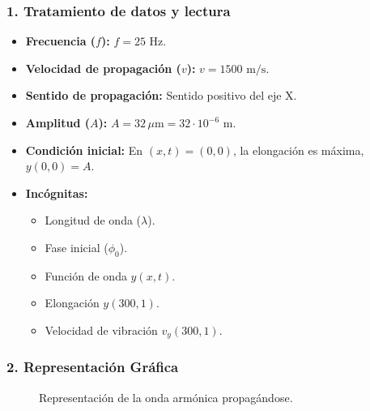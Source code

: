 \subsubsection*{1. Tratamiento de datos y lectura}
\begin{itemize}
    \item \textbf{Frecuencia ($f$):} $f = 25 \text{ Hz}$.
    \item \textbf{Velocidad de propagación ($v$):} $v = 1500 \text{ m/s}$.
    \item \textbf{Sentido de propagación:} Sentido positivo del eje X.
    \item \textbf{Amplitud ($A$):} $A = 32 \, \mu\text{m} = 32 \cdot 10^{-6} \text{ m}$.
    \item \textbf{Condición inicial:} En $(x,t)=(0,0)$, la elongación es máxima, $y(0,0)=A$.
    \item \textbf{Incógnitas:}
    \begin{itemize}
        \item Longitud de onda ($\lambda$).
        \item Fase inicial ($\phi_0$).
        \item Función de onda $y(x,t)$.
        \item Elongación $y(300, 1)$.
        \item Velocidad de vibración $v_y(300, 1)$.
    \end{itemize}
\end{itemize}

\subsubsection*{2. Representación Gráfica}
\begin{figure}[H]
    \centering
    \caption{Representación de la onda armónica propagándose.}
\end{figure}

